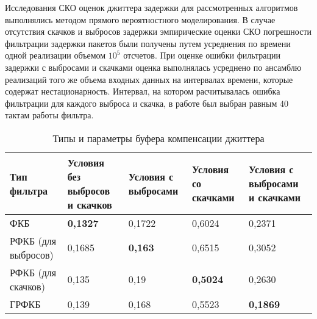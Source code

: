 

Исследования СКО оценок джиттера задержки для рассмотренных алгоритмов выполнялись методом прямого вероятностного моделирования.
В случае отсутствия скачков и выбросов задержки эмпирические оценки СКО погрешности фильтрации задержки пакетов были получены путем усреднения по времени одной реализации объемом $10^5$ отсчетов.
При оценке ошибки фильтрации задержки с выбросами и скачками оценка выполнялась усреднено по ансамблю реализаций того же объема входных данных на интервалах времени, которые содержат нестационарность.
Интервал, на котором расчитывалась ошибка фильтрации для каждого выброса и скачка, в работе был выбран равным 40 тактам работы фильтра.

\begin{table} [!h]
  \centering
  \parbox{15cm}{\caption{Типы и параметры буфера компенсации джиттера}\label{fkDiffSit}}
\begin{tabular}{|p{3cm}|p{3cm}|p{3cm}|p{3cm}|p{3cm}|}
    \hline
    Тип фильтра        & Условия без выбросов и скачков & Условия с выбросами & Условия со скачками  & Условия с выбросами и скачками \\ \hline
    ФКБ                 & \textbf{0,1327}                 & 0,1722                   & 0,6024                 & 0,2371                           \\ \hline
    РФКБ (для выбросов) & 0,1685                          &  \textbf{0,163}       & 0,6515                 & 0,3052                           \\ \hline
    РФКБ (для скачков)   & 0,135                           & 0,19               & \textbf{0,5024}                & 0,2630                             \\ \hline
    ГРФКБ               & 0,139                          & 0,168               &   0,5523            & \textbf{0,1869}                           \\ \hline
    \end{tabular}
\end{table}








